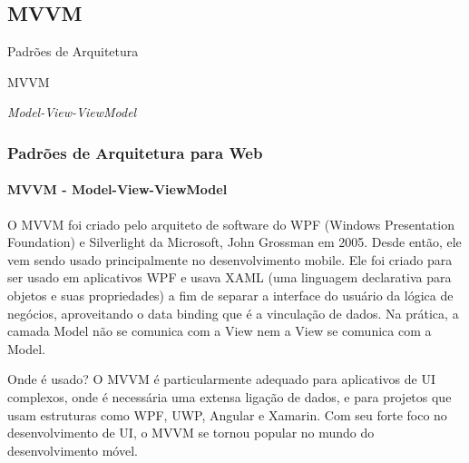 \documentclass[
	9pt, %
	t, %
]{beamer}
\begin{document}

\subsection{MVVM}

\begin{frame}
	\begin{center}
		
		\bigskip\bigskip\bigskip\bigskip %
		{\Large Padrões de Arquitetura}
		
		\bigskip\bigskip %
		{\Huge MVVM}
		
		\smallskip
		{\small \textit{Model-View-ViewModel}}
	\end{center}

\end{frame}




\begin{frame}
	\frametitle{Padrões de Arquitetura para Web}
	\framesubtitle{MVVM - Model-View-ViewModel}

	O MVVM foi criado pelo arquiteto de software do WPF  (Windows Presentation Foundation) e Silverlight da Microsoft, John Grossman em 2005. Desde então, ele vem sendo usado principalmente no desenvolvimento mobile. Ele foi criado para ser usado em aplicativos WPF e usava XAML (uma linguagem declarativa para objetos e suas propriedades) a fim de separar a interface do usuário da lógica de negócios, aproveitando o data binding que é a vinculação de dados. Na prática, a camada Model não se comunica com a View nem a View se comunica com a Model.

	\begin{block}{Onde é usado?}
		O MVVM é particularmente adequado para aplicativos de \alert{UI complexos}, onde é necessária uma extensa ligação de dados, e para projetos que usam estruturas como WPF, UWP, Angular e Xamarin. Com seu forte foco no desenvolvimento de UI, o MVVM se tornou popular no mundo do \alert{desenvolvimento móvel}.
	\end{block}

	
\end{frame}
\end{document}
